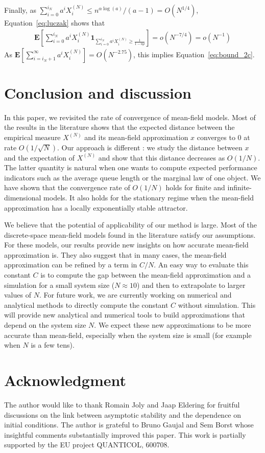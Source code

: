 \documentclass[sigconf]{acmart}
\newcommand\XN{X^{(N)}}
\newcommand\esp[1]{\mathbf{E}\left[#1\right]}
\begin{document}
Finally, as
$\sum_{i=0}^{i_N}a^iX_i^{(N)}\le n^{\alpha\log(a)}/(a-1)=O(N^{1/4})$,
Equation~\eqref{eq:luczak} shows that
\begin{align*}
  \esp{\sum_{i=0}^{i_N}a^i\XN_i\mathbf{1}_{\sum_{i=0}^{i_N}a^i\XN_i\ge
  \frac{1}{1-a\rho}}} = o(N^{-7/4})=o(N^{-1}) 
\end{align*}
As $\esp{\sum_{i=i_N+1}^{\infty}a^i\XN_i}=O(N^{-2.75})$, this implies
Equation~\eqref{eq:bound_2c}.

\section{Conclusion and discussion}
\label{sec:conclusion}

In this paper, we revisited the rate of convergence of mean-field
models. Most of the results in the literature shows that the expected
distance between the empirical measure $\XN$ and its mean-field
approximation $x$ converges to $0$ at rate $O(1/\sqrt{N})$. Our
approach is different : we study the distance between $x$ and the
expectation of $\XN$ and show that this distance decreases as
$O(1/N)$. The latter quantity is natural when one wants to compute
expected performance indicators such as the average queue length or
the marginal law of one object.  We have shown that the convergence
rate of $O(1/N)$ holds for finite and infinite-dimensional models. It
also holds for the stationary regime when the mean-field approximation
has a locally exponentially stable attractor.

We believe that the potential of applicability of our method is
large. Most of the discrete-space mean-field models found in the
literature satisfy our assumptions.  For these models, our results
provide new insights on how accurate mean-field approximation is. They
also suggest that in many cases, the mean-field approximation can be
refined by a term in $C/N$.  An easy way to evaluate this constant $C$
is to compute the gap between the mean-field approximation and a
simulation for a small system size ($N\approx10$) and then to
extrapolate to larger values of $N$.  For future work, we are
currently working on numerical and analytical methods to directly
compute the constant $C$ without simulation.  This will provide new
analytical and numerical tools to build approximations that depend on
the system size $N$. We expect these new approximations to be more
accurate than mean-field, especially when the system size is small
(for example when $N$ is a few tens).

\section{Acknowledgment}

The author would like to thank Romain Joly and Jaap Eldering for
fruitful discussions on the link between asymptotic stability and
the dependence on initial conditions. The author is grateful to
Bruno Gaujal and Sem Borst whose insightful comments substantially
improved this paper.  This work is partially supported by the EU
project QUANTICOL, 600708.



\end{document}
